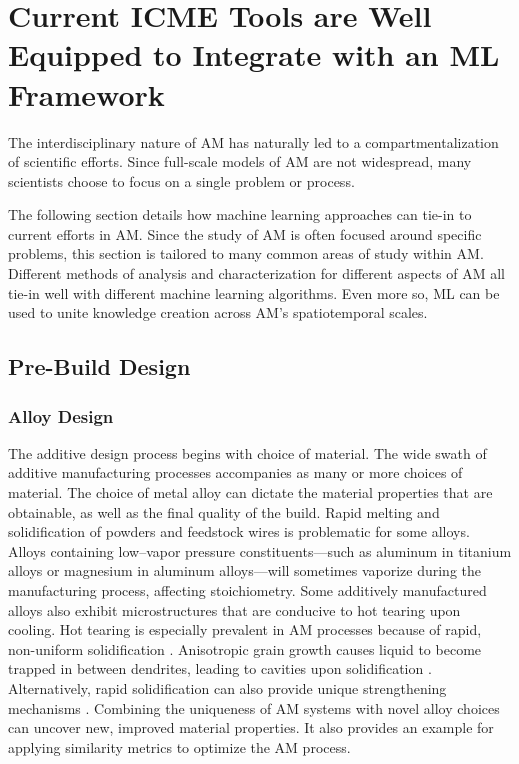 \section{Current ICME Tools are Well Equipped to Integrate with an ML Framework}
The interdisciplinary nature of AM has naturally led to a compartmentalization of scientific efforts. Since full-scale models of AM are not widespread, many scientists choose to focus on a single problem or process. 

The following section details how machine learning approaches can tie-in to current efforts in AM. Since the study of AM is often focused around specific problems, this section is tailored to many common areas of study within AM. Different methods of analysis and characterization for different aspects of AM all tie-in well with different machine learning algorithms. Even more so, ML can be used to unite knowledge creation across AM's spatiotemporal scales.

\subsection{Pre-Build Design}
\subsubsection{Alloy Design}
The additive design process begins with choice of material. The wide swath of additive manufacturing processes \cite{WohlersReport2017} accompanies as many or more choices of material. The choice of metal alloy can dictate the material properties that are obtainable, as well as the final quality of the build. Rapid melting and solidification of powders and feedstock wires is problematic for some alloys. Alloys containing low--vapor pressure constituents---such as aluminum in titanium alloys or magnesium in aluminum alloys---will sometimes vaporize during the manufacturing process, affecting stoichiometry. Some additively manufactured alloys also exhibit microstructures that are conducive to hot tearing upon cooling. Hot tearing is especially prevalent in AM processes because of rapid, non-uniform solidification \cite{Sames2016, Chen2016}. Anisotropic grain growth causes liquid to become trapped in between dendrites, leading to cavities upon solidification \cite{Martin2017}. Alternatively, rapid solidification can also provide unique strengthening mechanisms \cite{Brice2018}. Combining the uniqueness of AM systems with novel alloy choices can uncover new, improved material properties. It also provides an example for applying similarity metrics to optimize the AM process.

